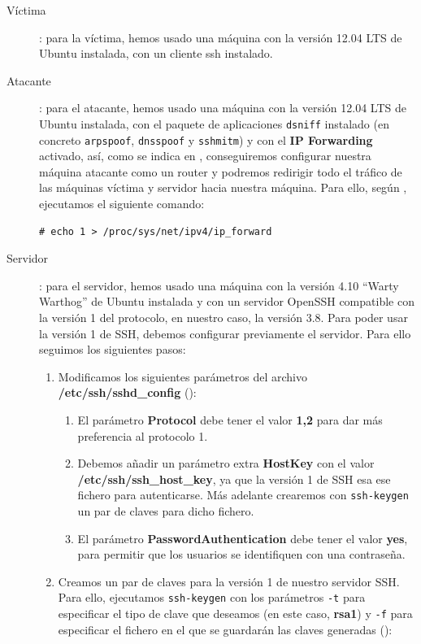 \documentclass[10pt,a4paper,spanish]{article}
\begin{document}
\begin{description}
    \item[Víctima]: para la víctima, hemos usado una máquina con la versión 12.04 LTS de Ubuntu instalada, con un cliente ssh instalado.
    \item[Atacante]: para el atacante, hemos usado una máquina con la versión 12.04 LTS de Ubuntu instalada, con el paquete de aplicaciones \texttt{dsniff} instalado (en concreto \texttt{arpspoof}, \texttt{dnsspoof} y \texttt{sshmitm}) y con el \textbf{IP Forwarding} activado, así, como se indica en \cite{barcelona}, conseguiremos configurar nuestra máquina atacante como un router y podremos redirigir todo el tráfico de las máquinas víctima y servidor hacia nuestra máquina. Para ello, según \cite{enableipf}, ejecutamos el siguiente comando:

\begin{verbatim}
# echo 1 > /proc/sys/net/ipv4/ip_forward
\end{verbatim}

    \item[Servidor]: para el servidor, hemos usado una máquina con la versión 4.10 ``Warty Warthog'' de Ubuntu instalada y con un servidor OpenSSH compatible con la versión 1 del protocolo, en nuestro caso, la versión 3.8. Para poder usar la versión 1 de SSH, debemos configurar previamente el servidor. Para ello seguimos los siguientes pasos:
    \begin{enumerate}[1.]
        \item Modificamos los siguientes parámetros del archivo \textbf{/etc/ssh/sshd\_config} (\cite{sshd}):
        \begin{enumerate}[$\bullet$]
            \item El parámetro \textbf{Protocol} debe tener el valor \textbf{1,2} para dar más preferencia al protocolo 1.
            \item Debemos añadir un parámetro extra \textbf{HostKey} con el valor \textbf{/etc/ssh/ssh\_host\_key}, ya que la versión 1 de SSH esa ese fichero para autenticarse. Más adelante crearemos con \texttt{ssh-keygen} un par de claves para dicho fichero.
            \item El parámetro \textbf{PasswordAuthentication} debe tener el valor \textbf{yes}, para permitir que los usuarios se identifiquen con una contraseña.
        \end{enumerate}
        \item Creamos un par de claves para la versión 1 de nuestro servidor SSH. Para ello, ejecutamos \texttt{ssh-keygen} con los parámetros \texttt{-t} para especificar el tipo de clave que deseamos (en este caso, \textbf{rsa1}) y \texttt{-f} para especificar el fichero en el que se guardarán las claves generadas (\cite{sshkeygen}):\\


\end{enumerate}
\end{description}
\end{document}
